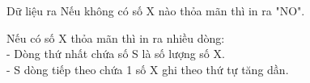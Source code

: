 Dữ liệu ra
Nếu không có số X nào thỏa mãn thì in ra "NO".  

   Nếu có số X thỏa mãn thì in ra nhiều dòng:   
\\   - Dòng thứ nhất chứa số S là số lượng số X.   
\\   - S dòng tiếp theo chứa 1 số X ghi theo thứ tự tăng dần.